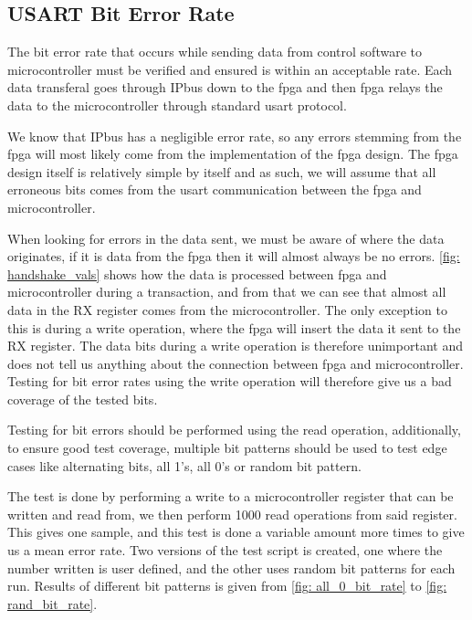 \documentclass[main.tex]{subfiles}
\begin{document}
\subsection{USART Bit Error Rate}

\label{ssec: bit_error}
The bit error rate that occurs while sending data from control software to microcontroller must be verified and ensured is within an acceptable rate. Each data transferal goes through IPbus down to the \gls{fpga} and then \gls{fpga} relays the data to the microcontroller through standard \gls{usart} protocol.

We know that IPbus has a negligible error rate\cite{IPbus}, so any errors stemming from the \gls{fpga} will most likely come from the implementation of the \gls{fpga} design. The \gls{fpga} design itself is relatively simple by itself and as such, we will assume that all erroneous bits comes from the \gls{usart} communication between the \gls{fpga} and microcontroller.

When looking for errors in the data sent, we must be aware of where the data originates, if it is data from the \gls{fpga} then it will almost always be no errors. \autoref{fig: handshake_vals} shows how the data is processed between \gls{fpga} and microcontroller during a transaction, and from that we can see that almost all data in the RX register comes from the microcontroller. The only exception to this is during a write operation, where the \gls{fpga} will insert the data it sent to the RX register. The data bits during a write operation is therefore unimportant and does not tell us anything about the connection between \gls{fpga} and microcontroller. Testing for bit error rates using the write operation will therefore give us a bad coverage of the tested bits.

Testing for bit errors should be performed using the read operation, additionally, to ensure good test coverage, multiple bit patterns should be used to test edge cases like alternating bits, all 1's, all 0's or random bit pattern.

The test is done by performing a write to a microcontroller register that can be written and read from, we then perform 1000 read operations from said register. This gives one sample, and this test is done a variable amount more times to give us a mean error rate. Two versions of the test script is created, one where the number written is user defined, and the other uses random bit patterns for each run. Results of different bit patterns is given from \autoref{fig: all_0_bit_rate} to \ref{fig: rand_bit_rate}.
\end{document}
